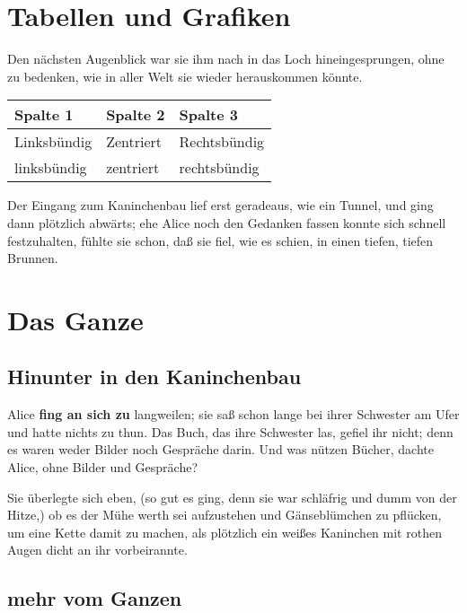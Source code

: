 \documentclass[DIV=calc,10pt,parskip=half,twocolumn]{scrartcl}
\begin{document}
\section{Tabellen und Grafiken}

Den nächsten Augenblick war sie ihm nach in das Loch hineingesprungen, ohne zu
bedenken, wie in aller Welt sie wieder herauskommen könnte.

\begin{center}
\begin{tabular}{lll}
  \toprule
   Spalte 1 &  Spalte 2 & Spalte 3\\
   \midrule
   Linksbündig & Zentriert & Rechtsbündig\\
   linksbündig & zentriert & rechtsbündig\\
   \bottomrule
\end{tabular}
\end{center}

Der Eingang zum Kaninchenbau lief erst geradeaus, wie ein Tunnel, und ging dann
plötzlich abwärts; ehe Alice noch den Gedanken fassen konnte sich schnell
festzuhalten, fühlte sie schon, daß sie fiel, wie es schien, in einen tiefen,
tiefen Brunnen.


\clearpage


\section{Das Ganze}



\subsection{Hinunter in den Kaninchenbau}

Alice {\bfseries fing an sich zu} langweilen; sie saß schon lange bei ihrer Schwester am
Ufer und hatte nichts zu thun. Das Buch, das ihre Schwester las, gefiel ihr
nicht; denn es waren weder Bilder noch Gespräche darin. \grqq{} Und was nützen
Bücher,\grqq{}  dachte Alice, \grqq{}ohne Bilder und Gespräche?\grqq 

Sie überlegte sich eben, (so gut es ging, denn sie war schläfrig und dumm von
der Hitze,) ob es der Mühe werth sei aufzustehen und Gänseblümchen zu pflücken,
um eine Kette damit zu machen, als plötzlich ein weißes Kaninchen mit rothen
Augen dicht an ihr vorbeirannte.

\subsection{mehr vom Ganzen}
\end{document}
